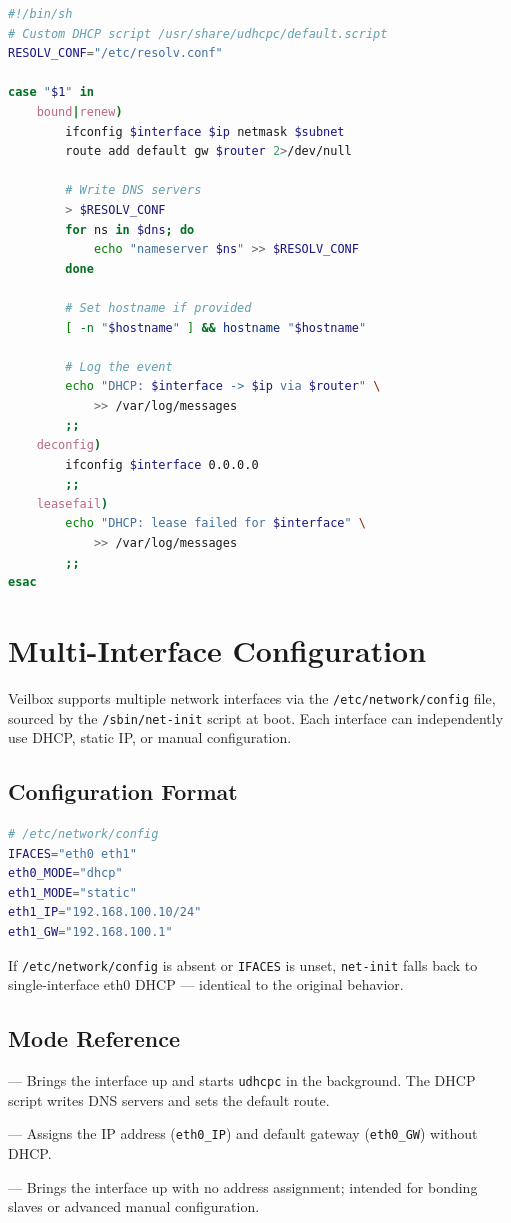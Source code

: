 \begin{lstlisting}[language=bash]
#!/bin/sh
# Custom DHCP script /usr/share/udhcpc/default.script
RESOLV_CONF="/etc/resolv.conf"

case "$1" in
    bound|renew)
        ifconfig $interface $ip netmask $subnet
        route add default gw $router 2>/dev/null

        # Write DNS servers
        > $RESOLV_CONF
        for ns in $dns; do
            echo "nameserver $ns" >> $RESOLV_CONF
        done

        # Set hostname if provided
        [ -n "$hostname" ] && hostname "$hostname"

        # Log the event
        echo "DHCP: $interface -> $ip via $router" \
            >> /var/log/messages
        ;;
    deconfig)
        ifconfig $interface 0.0.0.0
        ;;
    leasefail)
        echo "DHCP: lease failed for $interface" \
            >> /var/log/messages
        ;;
esac
\end{lstlisting}

\section{Multi-Interface Configuration}

Veilbox supports multiple network interfaces via the \texttt{/etc/network/config}
file, sourced by the \texttt{/sbin/net-init} script at boot. Each interface can
independently use DHCP, static IP, or manual configuration.

\subsection{Configuration Format}

\begin{lstlisting}[language=bash]
# /etc/network/config
IFACES="eth0 eth1"
eth0_MODE="dhcp"
eth1_MODE="static"
eth1_IP="192.168.100.10/24"
eth1_GW="192.168.100.1"
\end{lstlisting}

If \texttt{/etc/network/config} is absent or \texttt{IFACES} is unset,
\texttt{net-init} falls back to single-interface eth0 DHCP — identical to the
original behavior.

\subsection{Mode Reference}

\begin{description}[nosep]
  \item[\texttt{dhcp}] — Brings the interface up and starts \texttt{udhcpc}
        in the background. The DHCP script writes DNS servers and sets the
        default route.
  \item[\texttt{static}] — Assigns the IP address (\texttt{eth0\_IP}) and
        default gateway (\texttt{eth0\_GW}) without DHCP.
  \item[\texttt{manual}] — Brings the interface up with no address assignment;
        intended for bonding slaves or advanced manual configuration.
\end{description}

